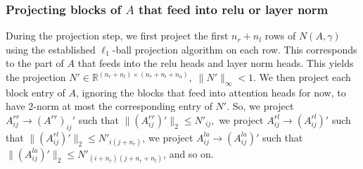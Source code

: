 \documentclass{article}
\begin{document}
\subsubsection{Projecting blocks of \texorpdfstring{$A$}{} that feed into relu or layer norm}
During the projection step, we first project the first $n_r+n_l$ rows of $N(A, \gamma)$ using the
established $\ell_1$-ball projection algorithm on each row. This corresponds to the part of 
$A$ that feeds into the relu heads and layer norm heads. 
This yields the projection $N' \in \mathbb R^{(n_r + n_l)\times (n_r+ n_l+n_a)},\; \|N'\|_\infty < 1$.
We then project each block entry of $A$, ignoring the blocks that feed into attention heads for now,
to have 2-norm at most the corresponding entry of $N'$.
So, we project $A^{rr}_{ij} \to (A^{rr})_{ij}'$ such that 
$\|(A^{rr}_{ij})'\|_2 \leq N'_{ij},$ we project $A^{rl}_{ij} \to (A^{rl}_{ij})'$ such that 
$\|(A^{rl}_{ij})'\|_2 \leq N'_{i(j+n_r)}$, we project
$A^{la}_{ij} \to (A^{la}_{ij})'$ such that $\|(A^{la}_{ij})'\|_2 \leq N'_{(i+n_r)(j+n_r+n_l)}$,
and so on.
\end{document}
